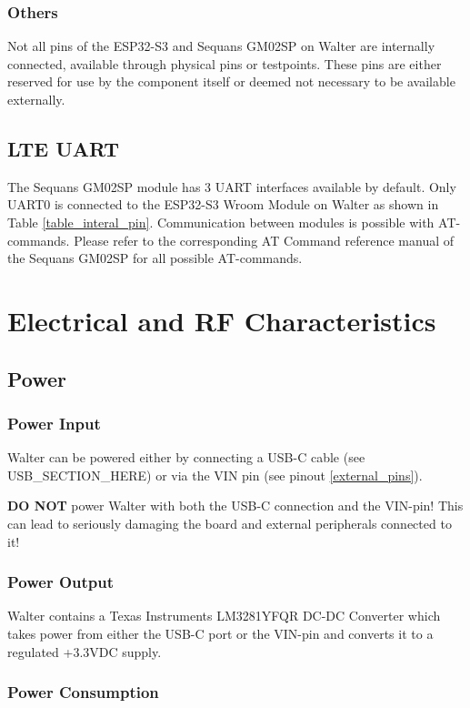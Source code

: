 \documentclass[11pt]{article}
\begin{document}
\subsubsection{Others}
Not all pins of the ESP32-S3 and Sequans GM02SP on Walter are internally connected, available through physical pins or testpoints. These pins are either reserved for use by the component itself or deemed not necessary to be available externally.

\subsection{LTE UART} \label{lte_uart}
The Sequans GM02SP module has 3 UART interfaces available by default. Only UART0 is connected to the ESP32-S3 Wroom Module on Walter as shown in Table \ref{table_interal_pin}. Communication between modules is possible with AT-commands. Please refer to the corresponding AT Command reference manual of the Sequans GM02SP for all possible AT-commands.


\section{Electrical and RF Characteristics} \label{power_rf_characteristics}
\subsection{Power} \label{power}
\subsubsection{Power Input}
Walter can be powered either by connecting a USB-C cable (see USB\_SECTION\_HERE) or via the VIN pin (see pinout \ref{external_pins}).\newline

\textbf{DO NOT} power Walter with both the USB-C connection and the VIN-pin! This can lead to seriously damaging the board and external peripherals connected to it!
\subsubsection{Power Output}
Walter contains a Texas Instruments LM3281YFQR DC-DC Converter which takes power from either the USB-C port or the VIN-pin and converts it to a regulated +3.3VDC supply.
\subsubsection{Power Consumption}
\end{document}
